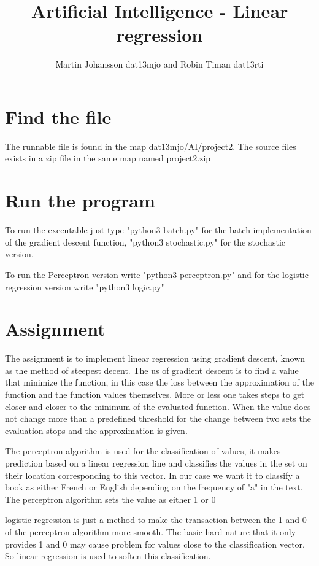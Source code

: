 \documentclass[a4paper]{article}
\begin{document}
\title{Artificial Intelligence - Linear regression}
\author{Martin Johansson dat13mjo and Robin Timan dat13rti}
\maketitle

\section{Find the file}

The runnable file is found in the map dat13mjo/AI/project2. The source files exists in a zip file in the same map named project2.zip

\section{Run the program}
To run the executable just type "python3 batch.py" for the batch implementation of the gradient descent function, "python3 stochastic.py" for the stochastic version. 

To run the Perceptron version write "python3 perceptron.py" and for the logistic regression version write "python3 logic.py"

\section{Assignment}

The assignment is to implement linear regression using gradient descent, known as the method of steepest decent. The us of gradient descent is to find a value that minimize the function, in this case the loss between the approximation of the function and the function values themselves. More or less one takes steps to get closer and closer to the minimum of the evaluated function. When the value does not change more than a predefined threshold for the change between two sets the evaluation stops and the approximation is given. 

The perceptron algorithm is used for the classification of values, it makes prediction based on a linear regression line and classifies the values in the set on their location corresponding to this vector. In our case we want it to classify a book as either French or English depending on the frequency of "a" in the text. The perceptron algorithm sets the value as either 1 or 0 

logistic regression is just a method to make the transaction between the 1 and 0 of the perceptron algorithm more smooth. The basic hard nature that it only provides 1 and 0 may cause problem for values close to the classification vector. So linear regression is used to soften this classification.
\end{document}
